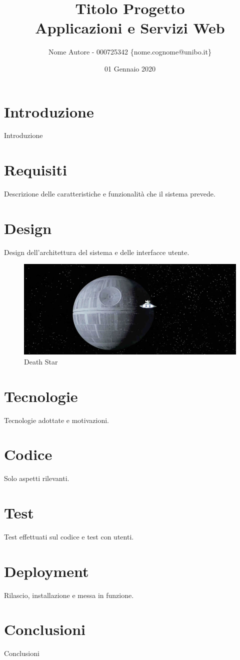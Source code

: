 \documentclass{report}
\title{
    Titolo Progetto \\
    \large Applicazioni e Servizi Web
}
\author{Nome Autore - 000725342 \{nome.cognome@unibo.it\}}
\date{01 Gennaio 2020}
\begin{document}
\maketitle
\section{Introduzione}
Introduzione \citep{adams1995hitchhiker}

\section{Requisiti}
Descrizione delle caratteristiche e funzionalità che il sistema prevede. 

\section{Design}
Design dell'architettura del sistema e delle interfacce utente.

\begin{figure}[h!]
\centering
\includegraphics[scale=0.44]{deathStar2.jpg}
\caption{Death Star}
\label{fig:deathstar}
\end{figure}

\section{Tecnologie}
Tecnologie adottate e motivazioni.

\section{Codice}
Solo aspetti rilevanti.

\section{Test}
Test effettuati sul codice e test con utenti.

\section{Deployment}
Rilascio, installazione e messa in funzione.


\section{Conclusioni}
Conclusioni



\end{document}
